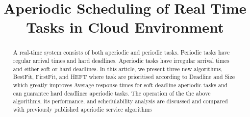 \documentclass[conference]{IEEEtran}
\begin{document}
\title{Aperiodic Scheduling of Real Time Tasks in Cloud Environment\\}

\author{
\and
{}

}

\maketitle

\begin{abstract}
 A real-time system consists of both aperiodic and periodic tasks. Periodic tasks have regular arrival
times and hard deadlines. Aperiodic tasks have irregular arrival times and either soft or hard deadlines. In this
article, we present three new algorithms, BestFit, FirstFit, and HEFT where task are prioritised according to Deadline and Size which greatly improves Average response times for
soft deadline aperiodic tasks and can guarantee hard deadlines aperiodic tasks. The operation of the the above algorithms, its performance, and schedulability analysis are discussed and compared with previously published aperiodic service algorithms
\end{abstract}

\end{document}
